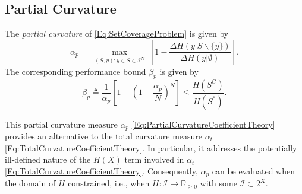 \documentclass[letterpaper, 10 pt, conference]{ieeeconf}
\newcommand{\R}{\mathbb{R}}
\begin{document}



\subsection{Partial Curvature \cite{Liu2018}}
\label{SubSec:PartialCurvature}

The \emph{partial curvature} of \eqref{Eq:SetCoverageProblem} is given by
\begin{equation}\label{Eq:PartialCurvatureCoefficientTheory}
    \alpha_p = 
    \max_{\substack{(S,y): y \in S \in \mathcal{I}^N}}\left[1-\frac{\Delta H(y \vert S \backslash \{y\}) }{\Delta H(y \vert \emptyset)}\right].
\end{equation}
The corresponding performance bound $\beta_p$ is given by 
\begin{equation}\label{Eq:PartialCurvatureBoundTheory}
    \beta_p \triangleq \frac{1}{\alpha_p}\left[1-\left(1-\frac{\alpha_p}{N}\right)^N\right] \leq \frac{H(S^G)}{H(S^*)}.
\end{equation}

This partial curvature measure $\alpha_p$ \eqref{Eq:PartialCurvatureCoefficientTheory} provides an alternative to the total curvature measure $\alpha_t$ \eqref{Eq:TotalCurvatureCoefficientTheory}. In particular, it addresses the potentially ill-defined nature of the $H(X)$ term involved in $\alpha_t$ \eqref{Eq:TotalCurvatureCoefficientTheory}. Consequently, $\alpha_p$ can be evaluated when the domain of $H$ constrained, i.e., when $H:\mathcal{I}\rightarrow \R_{\geq0}$ with some $\mathcal{I} \subset 2^X$.
\end{document}
